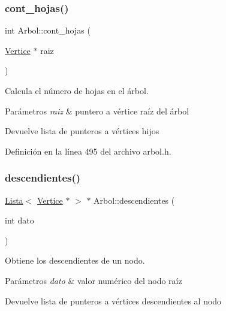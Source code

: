 \subsubsection{\texorpdfstring{cont\+\_\+hojas()}{cont\_hojas()}}
{\footnotesize\ttfamily int Arbol\+::cont\+\_\+hojas (\begin{DoxyParamCaption}\item[{\hyperlink{classVertice}{Vertice} $\ast$}]{raiz }\end{DoxyParamCaption})}



Calcula el número de hojas en el árbol. 


\begin{DoxyParams}{Parámetros}
{\em raiz} & puntero a vértice raíz del árbol \\
\hline
\end{DoxyParams}
\begin{DoxyReturn}{Devuelve}
lista de punteros a vértices hijos 
\end{DoxyReturn}


Definición en la línea 495 del archivo arbol.\+h.

\mbox{\label{classArbol_acae8e9dfd17ae18e250d9029172e1c9e}} 
\subsubsection{\texorpdfstring{descendientes()}{descendientes()}\hspace{0.1cm}{\footnotesize\ttfamily [1/2]}}
{\footnotesize\ttfamily \hyperlink{classLista}{Lista}$<$ \hyperlink{classVertice}{Vertice} $\ast$ $>$ $\ast$ Arbol\+::descendientes (\begin{DoxyParamCaption}\item[{int}]{dato }\end{DoxyParamCaption})}



Obtiene los descendientes de un nodo. 


\begin{DoxyParams}{Parámetros}
{\em dato} & valor numérico del nodo raíz \\
\hline
\end{DoxyParams}
\begin{DoxyReturn}{Devuelve}
lista de punteros a vértices descendientes al nodo 
\end{DoxyReturn}


